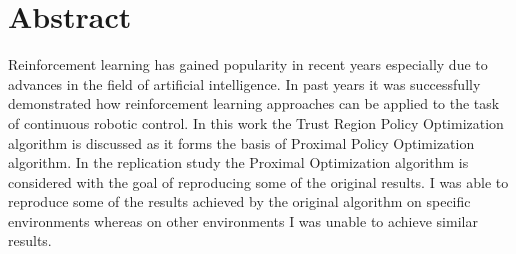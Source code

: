 \chapter*{Abstract}
Reinforcement learning has gained popularity in recent years especially due to advances in the field of artificial intelligence.
In past years it was successfully demonstrated how reinforcement learning approaches can be applied to the task
of continuous robotic control.
In this work the Trust Region Policy Optimization algorithm is discussed as it forms the basis of Proximal Policy Optimization
algorithm.
In the replication study the Proximal Optimization algorithm is considered with the goal of reproducing some of the original results.
I was able to reproduce some of the results achieved by the original algorithm on specific environments whereas on other
environments I was unable to achieve similar results.